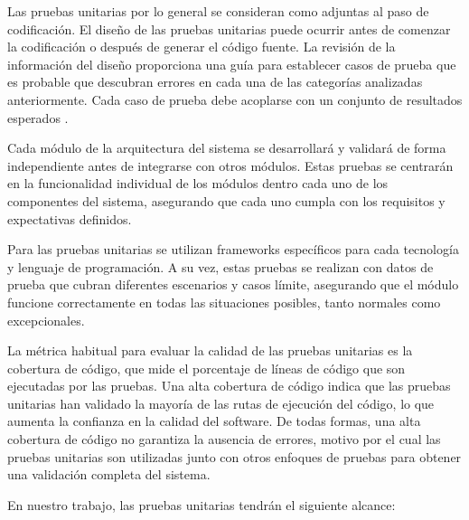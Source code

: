 \documentclass[main.tex]{subfiles}
\begin{document}
Las pruebas unitarias por lo general se consideran como adjuntas al paso de codificación. El diseño de las pruebas unitarias puede ocurrir antes de comenzar la codificación o después de generar el código fuente. La revisión de la información del diseño proporciona una guía para establecer casos de prueba que es probable que descubran errores en cada una de las categorías analizadas anteriormente. Cada caso de prueba debe acoplarse con un conjunto de resultados esperados \cite{pressman2010ingeneria}.

Cada módulo de la arquitectura del sistema se desarrollará y validará de forma independiente antes de integrarse con otros módulos. Estas pruebas se centrarán en la funcionalidad individual de los módulos dentro cada uno de los componentes del sistema, asegurando que cada uno cumpla con los requisitos y expectativas definidos.

Para las pruebas unitarias se utilizan frameworks específicos para cada tecnología y lenguaje de programación. A su vez, estas pruebas se realizan con datos de prueba que cubran diferentes escenarios y casos límite, asegurando que el módulo funcione correctamente en todas las situaciones posibles, tanto normales como excepcionales.

La métrica habitual para evaluar la calidad de las pruebas unitarias es la cobertura de código, que mide el porcentaje de líneas de código que son ejecutadas por las pruebas. Una alta cobertura de código indica que las pruebas unitarias han validado la mayoría de las rutas de ejecución del código, lo que aumenta la confianza en la calidad del software. De todas formas, una alta cobertura de código no garantiza la ausencia de errores, motivo por el cual las pruebas unitarias son utilizadas junto con otros enfoques de pruebas para obtener una validación completa del sistema.

En nuestro trabajo, las pruebas unitarias tendrán el siguiente alcance:
\end{document}
